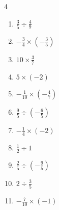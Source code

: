 \begin{multicols}{4}
\begin{enumerate}
  \item $\displaystyle \frac{3}{5}\div{}\frac{4}{9}$


  \item $\displaystyle -\frac{3}{4}\times{}\left(-\frac{3}{5}\right)$


  \item $\displaystyle 10\times{}\frac{3}{7}$


  \item $\displaystyle 5\times{}\left(-2\right)$

        \phantom{$\displaystyle =-10$}

  \item $\displaystyle -\frac{1}{10}\times{}\left(-\frac{4}{7}\right)$


  \item $\displaystyle \frac{9}{5}\div{}\left(-\frac{6}{5}\right)$


\columnbreak %

\resetques

  \item $\displaystyle -\frac{1}{4}\times{}\left(-2\right)$


  \item $\displaystyle \frac{1}{2}\div{}1$


  \item $\displaystyle \frac{2}{5}\div{}\left(-\frac{9}{5}\right)$


  \item $\displaystyle 2\div{}\frac{3}{5}$


  \item $\displaystyle -\frac{7}{10}\times{}\left(-1\right)$



\end{enumerate}
\end{multicols}
